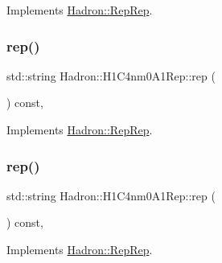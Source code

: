 Implements \mbox{\hyperlink{structHadron_1_1RepRep_ab3213025f6de249f7095892109575fde}{Hadron\+::\+Rep\+Rep}}.

\mbox{\label{structHadron_1_1H1C4nm0A1Rep_acc6e3a3585fdfea2b5ef14c6035964e2}} 
\subsubsection{\texorpdfstring{rep()}{rep()}\hspace{0.1cm}{\footnotesize\ttfamily [2/5]}}
{\footnotesize\ttfamily std\+::string Hadron\+::\+H1\+C4nm0\+A1\+Rep\+::rep (\begin{DoxyParamCaption}{ }\end{DoxyParamCaption}) const\hspace{0.3cm}{\ttfamily [inline]}, {\ttfamily [virtual]}}



Implements \mbox{\hyperlink{structHadron_1_1RepRep_ab3213025f6de249f7095892109575fde}{Hadron\+::\+Rep\+Rep}}.

\mbox{\label{structHadron_1_1H1C4nm0A1Rep_acc6e3a3585fdfea2b5ef14c6035964e2}} 
\subsubsection{\texorpdfstring{rep()}{rep()}\hspace{0.1cm}{\footnotesize\ttfamily [3/5]}}
{\footnotesize\ttfamily std\+::string Hadron\+::\+H1\+C4nm0\+A1\+Rep\+::rep (\begin{DoxyParamCaption}{ }\end{DoxyParamCaption}) const\hspace{0.3cm}{\ttfamily [inline]}, {\ttfamily [virtual]}}



Implements \mbox{\hyperlink{structHadron_1_1RepRep_ab3213025f6de249f7095892109575fde}{Hadron\+::\+Rep\+Rep}}.

\mbox{\label{structHadron_1_1H1C4nm0A1Rep_acc6e3a3585fdfea2b5ef14c6035964e2}} 
